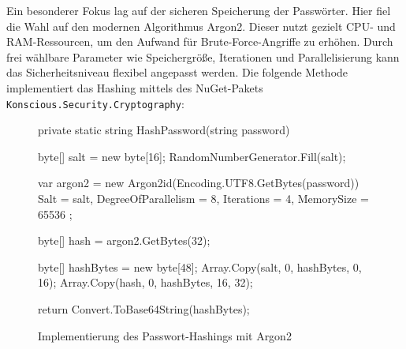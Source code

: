 Ein besonderer Fokus lag auf der sicheren Speicherung der Passwörter. Hier fiel die Wahl auf den modernen Algorithmus Argon2. Dieser nutzt gezielt CPU- und RAM-Ressourcen, um den Aufwand für Brute-Force-Angriffe zu erhöhen. Durch frei wählbare Parameter wie Speichergröße, Iterationen und Parallelisierung kann das Sicherheitsniveau flexibel angepasst werden. Die folgende Methode implementiert das Hashing mittels des NuGet-Pakets \texttt{Konscious.Security.Cryptography}:

\begin{figure}[H]
    \centering
    \begin{cs}
private static string HashPassword(string password)
{  
    byte[] salt = new byte[16];
    RandomNumberGenerator.Fill(salt);

    var argon2 = new Argon2id(Encoding.UTF8.GetBytes(password))
    {
        Salt = salt,
        DegreeOfParallelism = 8, 
        Iterations = 4,       
        MemorySize = 65536       
    };

    byte[] hash = argon2.GetBytes(32); 

    byte[] hashBytes = new byte[48];
    Array.Copy(salt, 0, hashBytes, 0, 16);
    Array.Copy(hash, 0, hashBytes, 16, 32);

    return Convert.ToBase64String(hashBytes); 
}
\end{cs}
    \caption{Implementierung des Passwort-Hashings mit Argon2}
\end{figure}